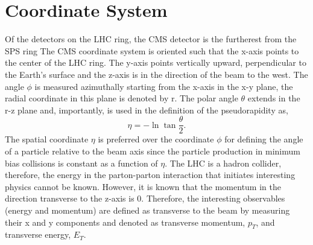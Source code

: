 


%
\section{Coordinate System}
Of the detectors on the LHC ring, the CMS detector is the furtherest from the SPS ring %
The CMS coordinate system is oriented such that the x-axis points to the center of the LHC
ring. The y-axis points vertically upward, perpendicular to the Earth's surface and
the z-axis is in the direction of the beam to the west. The angle $\phi$ is measured
azimuthally starting from the x-axis in the x-y plane, the radial coordinate in this plane
is denoted by r. The polar angle $\theta$ extends in the r-z plane and, importantly,
is used in the definition of the pseudorapidity as, 
\begin{displaymath}
\eta=-\ln{\tan\frac{\theta}{2}}.
\end{displaymath}
The spatial coordinate $\eta$ is preferred over the coordinate $\phi$ for 
defining the angle of a particle relative to the beam axis since
the particle production in minimum bias collisions is constant as a function of $\eta$.
The LHC is a hadron collider, therefore, the energy in the parton-parton interaction
that initiates interesting physics cannot be known. However, it is known that 
the momentum in the direction transverse to the z-axis is 0. Therefore,
the interesting observables (energy and momentum) are defined as transverse
to the beam by measuring their x and y components and denoted as transverse
momentum, $p_{T}$, and transverse energy, $E_{T}$.%
%
